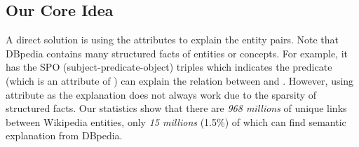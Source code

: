 %

\subsection{Our Core Idea}
A direct solution is using the attributes to explain the entity pairs.
Note that DBpedia contains many structured facts of entities or concepts.
For example, it has the SPO (subject-predicate-object) triples  which indicates the predicate  (which is an attribute of ) can explain the relation between  and .
However, using attribute as the explanation does not always work due to the sparsity of structured facts.
Our statistics show that there are \emph{968 millions} of unique links between Wikipedia entities, only \emph{15 millions} (1.5\%) of which can find semantic explanation from DBpedia.


